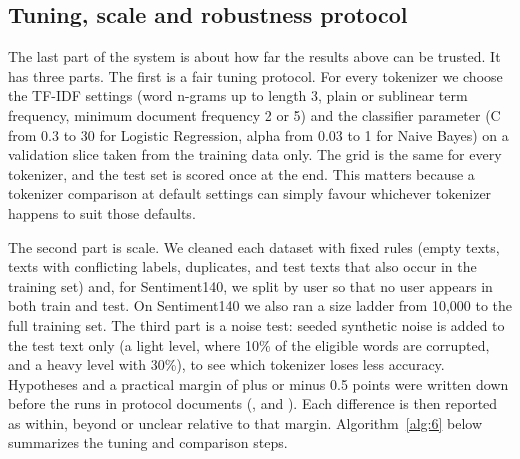 \documentclass{ieeeaccess}
\begin{document}
\subsection{Tuning, scale and robustness protocol}\label{sec:3.7}
The last part of the system is about how far the results above can be trusted. It has three parts. The first is a fair tuning protocol. For every tokenizer we choose the TF-IDF settings (word n-grams up to length 3, plain or sublinear term frequency, minimum document frequency 2 or 5) and the classifier parameter (C from 0.3 to 30 for Logistic Regression, alpha from 0.03 to 1 for Naive Bayes) on a validation slice taken from the training data only. The grid is the same for every tokenizer, and the test set is scored once at the end. This matters because a tokenizer comparison at default settings can simply favour whichever tokenizer happens to suit those defaults.

The second part is scale. We cleaned each dataset with fixed rules (empty texts, texts with conflicting labels, duplicates, and test texts that also occur in the training set) and, for Sentiment140, we split by user so that no user appears in both train and test. On Sentiment140 we also ran a size ladder from 10,000 to the full training set. The third part is a noise test: seeded synthetic noise is added to the test text only (a light level, where 10\% of the eligible words are corrupted, and a heavy level with 30\%), to see which tokenizer loses less accuracy. Hypotheses and a practical margin of plus or minus 0.5 points were written down before the runs in protocol documents (,  and ). Each difference is then reported as within, beyond or unclear relative to that margin. Algorithm~\ref{alg:6} below summarizes the tuning and comparison steps.
\end{document}
